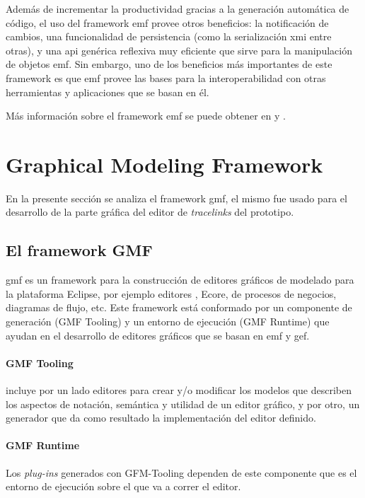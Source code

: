 \documentclass[a4paper,12pt,oneside,spanish]{book}
\begin{document}
Además de incrementar la productividad gracias a la generación automática de código, el uso del framework \gls{emf} provee otros beneficios: la notificación de cambios, una funcionalidad de persistencia (como la serialización \gls{xmi} entre otras), y una \gls{api} genérica reflexiva muy eficiente que sirve para la manipulación de objetos \gls{emf}. Sin embargo, uno de los beneficios más importantes de este framework es que \gls{emf} provee las bases para la interoperabilidad con otras herramientas y aplicaciones que se basan en él. 

Más información sobre el framework \gls{emf} se puede obtener en \cite{EMF} y \cite{EMFADG}.


\section{Graphical Modeling Framework}
\label{sec:GMF}

En la presente sección se analiza el framework \gls{gmf}, el mismo fue usado para el desarrollo de la parte gráfica del editor de \textit{tracelinks} del prototipo.

\subsection{El framework GMF}

\gls{gmf} es un framework para la construcción de editores gráficos de modelado para la plataforma \textsf{Eclipse}, por ejemplo editores , \textsf{Ecore}, de procesos de negocios, diagramas de flujo, etc. Este framework está conformado por un componente de generación (\textsf{GMF Tooling}) y un entorno de ejecución (\textsf{GMF Runtime}) que ayudan en el desarrollo de editores gráficos que se basan en \gls{emf} y \gls{gef}.

\paragraph{GMF Tooling} incluye por un lado editores para crear y/o modificar los modelos que describen los aspectos de notación, semántica y utilidad de un editor gráfico, y por otro, un generador que da como resultado la implementación del editor definido.

\paragraph{GMF Runtime} Los \textit{plug-ins} generados con \textsf{GFM-Tooling} dependen de este componente que es el entorno de ejecución sobre el que va a correr el editor.
\end{document}
